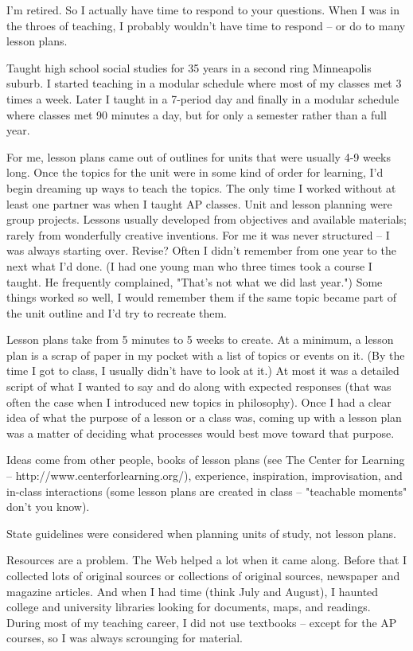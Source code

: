 \documentclass[10pt,letter]{article}
\begin{document}
I'm retired. So I actually have time to respond to your questions. When I was in
the throes of teaching, I probably wouldn't have time to respond -- or do to
many lesson plans.

Taught high school social studies for 35 years in a second ring Minneapolis
suburb. I started teaching in a modular schedule where most of my classes met 3
times a week. Later I taught in a 7-period day and finally in a modular schedule
where classes met 90 minutes a day, but for only a semester rather than a full
year.

For me, lesson plans came out of outlines for units that were usually 4-9 weeks
long. Once the topics for the unit were in some kind of order for learning, I'd
begin dreaming up ways to teach the topics.  The only time I worked without at
least one partner was when I taught AP classes. Unit and lesson planning were
group projects.  Lessons usually developed from objectives and available
materials; rarely from wonderfully creative inventions. For me it was never
structured -- I was always starting over. Revise? Often I didn't remember from
one year to the next what I'd done. (I had one young man who three times took a
course I taught. He frequently complained, "That's not what we did last year.")
Some things worked so well, I would remember them if the same topic became part
of the unit outline and I'd try to recreate them.

Lesson plans take from 5 minutes to 5 weeks to create. At a minimum, a lesson
plan is a scrap of paper in my pocket with a list of topics or events on it. (By
the time I got to class, I usually didn't have to look at it.) At most it was a
detailed script of what I wanted to say and do along with expected responses
(that was often the case when I introduced new topics in philosophy). Once I had
a clear idea of what the purpose of a lesson or a class was, coming up with a
lesson plan was a matter of deciding what processes would best move toward that
purpose.

Ideas come from other people, books of lesson plans (see The Center for Learning
-- http://www.centerforlearning.org/), experience, inspiration, improvisation,
and in-class interactions (some lesson plans are created in class -- "teachable
moments" don't you know).

State guidelines were considered when planning units of study, not lesson plans.

Resources are a problem. The Web helped a lot when it came along. Before that I
collected lots of original sources or collections of original sources, newspaper
and magazine articles. And when I had time (think July and August), I haunted
college and university libraries looking for documents, maps, and readings.
During most of my teaching career, I did not use textbooks -- except for the AP
courses, so I was always scrounging for material.
\end{document}

